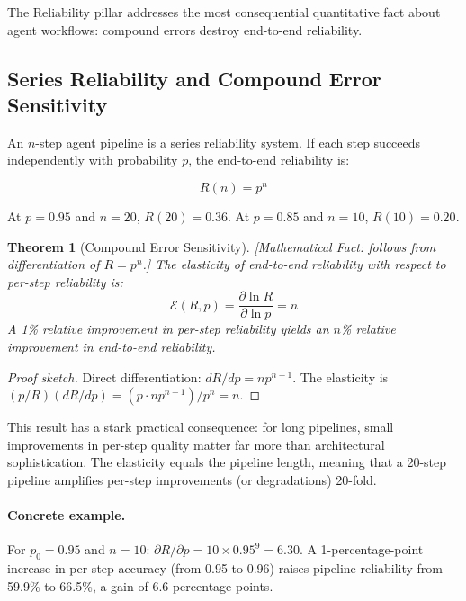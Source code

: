 \documentclass[11pt, a4paper, logo, copyright]{googledeepmind}
\newtheorem{theorem}{Theorem}[section]
\begin{document}
The Reliability pillar addresses the most consequential quantitative fact about agent workflows: compound errors destroy end-to-end reliability.

\subsection{Series Reliability and Compound Error Sensitivity}

An $n$-step agent pipeline is a series reliability system. If each step succeeds independently with probability $p$, the end-to-end reliability is:

\begin{equation}
    R(n) = p^n
\end{equation}

At $p = 0.95$ and $n = 20$, $R(20) = 0.36$. At $p = 0.85$ and $n = 10$, $R(10) = 0.20$.

\begin{theorem}[Compound Error Sensitivity]
\emph{[Mathematical Fact: follows from differentiation of $R = p^n$.]}
\label{thm:compound-sensitivity}
The elasticity of end-to-end reliability with respect to per-step reliability is:
\begin{equation}
    \mathcal{E}(R, p) = \frac{\partial \ln R}{\partial \ln p} = n
\end{equation}
A 1\% relative improvement in per-step reliability yields an $n$\% relative improvement in end-to-end reliability.
\end{theorem}

\begin{proof}[Proof sketch]
Direct differentiation: $dR/dp = n p^{n-1}$. The elasticity is $(p/R)(dR/dp) = (p \cdot n p^{n-1}) / p^n = n$.
\end{proof}

This result has a stark practical consequence: for long pipelines, small improvements in per-step quality matter far more than architectural sophistication. The elasticity equals the pipeline length, meaning that a 20-step pipeline amplifies per-step improvements (or degradations) 20-fold.

\paragraph{Concrete example.} For $p_0 = 0.95$ and $n = 10$: $\partial R/\partial p = 10 \times 0.95^9 = 6.30$. A 1-percentage-point increase in per-step accuracy (from 0.95 to 0.96) raises pipeline reliability from 59.9\% to 66.5\%, a gain of 6.6 percentage points.
\end{document}
